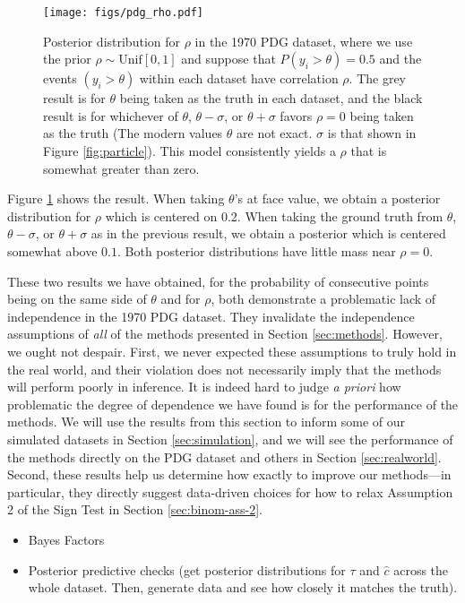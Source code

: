 \documentclass[letterpaper,12pt]{article}
\begin{document}
\begin{figure}[htbp]
  \centering
  \texttt{[image: figs/pdg\_rho.pdf]}
  \caption{Posterior distribution for $\rho$ in the 1970 PDG dataset, where we use the prior $\rho\sim\mathrm{Unif}[0,1]$ and suppose that $P(y_i>\theta)=0.5$ and the events $(y_i>\theta)$ within each dataset have correlation $\rho$. The grey result is for $\theta$ being taken as the truth in each dataset, and the black result is for whichever of $\theta$, $\theta-\sigma$, or $\theta+\sigma$ favors $\rho=0$ being taken as the truth (The modern values $\theta$ are not exact. $\sigma$ is that shown in Figure \ref{fig:particle}). This model consistently yields a $\rho$ that is somewhat greater than zero.}
  \label{fig:pdg-rho}
\end{figure}

Figure \ref{fig:pdg-rho} shows the result. When taking $\theta$'s at face value, we obtain a posterior distribution for $\rho$ which is centered on 0.2. When taking the ground truth from $\theta$, $\theta-\sigma$, or $\theta+\sigma$ as in the previous result, we obtain a posterior which is centered somewhat above $0.1$. Both posterior distributions have little mass near $\rho=0$.

These two results we have obtained, for the probability of consecutive points being on the same side of $\theta$ and for $\rho$, both demonstrate a problematic lack of independence in the 1970 PDG dataset. They invalidate the independence assumptions of \textit{all} of the methods presented in Section \ref{sec:methods}. However, we ought not despair. First, we never expected these assumptions to truly hold in the real world, and their violation does not necessarily imply that the methods will perform poorly in inference. It is indeed hard to judge \textit{a priori} how problematic the degree of dependence we have found is for the performance of the methods. We will use the results from this section to inform some of our simulated datasets in Section \ref{sec:simulation}, and we will see the performance of the methods directly on the PDG dataset and others in Section \ref{sec:realworld}. Second, these results help us determine how exactly to improve our methods---in particular, they directly suggest data-driven choices for how to relax Assumption 2 of the Sign Test in Section \ref{sec:binom-ass-2}.

\begin{itemize}

\item
  Bayes Factors
\item
  Posterior predictive checks (get posterior distributions for $\tau$ and $\hat{c}$ across the whole dataset. Then, generate data and see how closely it matches the truth).
\end{itemize}
\end{document}
